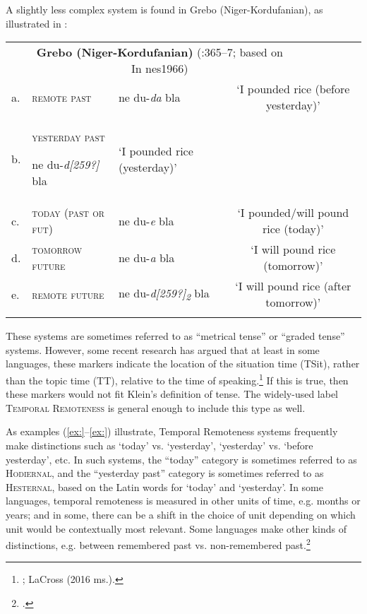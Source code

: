 A slightly less complex system is found in Grebo (Niger-Kordufanian), as illustrated in :


\begin{tabularx}{\textwidth}{XXXXX}
\lsptoprule
& \multicolumn{3}{c}{\textbf{Grebo (Niger-Kordufanian)} (\citealt{Frawley1992}:365–7; based on {In nes1966})} & \\
a. & \scshape remote past & ne du-\textit{da} bla & \multicolumn{2}{c}{‘I pounded rice (before yesterday)’}\\
b. & {\scshape yesterday past}

ne du-\textit{d[259?]} bla & ‘I pounded rice (yesterday)’ & \multicolumn{2}{c}{}\\
c. & \scshape today (past or fut) & ne du-\textit{e} bla & \multicolumn{2}{c}{‘I pounded/will pound rice (today)’}\\
d. & \scshape tomorrow future & ne du-\textit{a} bla & \multicolumn{2}{c}{‘I will pound rice (tomorrow)’}\\
e. & \scshape remote future & ne du-\textit{d[259?]\textsubscript{2}} bla & \multicolumn{2}{c}{‘I will pound rice (after tomorrow)’}\\
\lspbottomrule
\end{tabularx}

These systems are sometimes referred to as “metrical tense” or “graded tense” systems. However, some recent research has argued that at least in some languages, these markers indicate the location of the situation time (TSit), rather than the topic time (TT), relative to the time of speaking.\footnote{\citet{Cable2013}; LaCross (2016 ms.).} If this is true, then these markers would not fit Klein’s definition of tense. The widely-used label \textsc{Temporal Remoteness} is general enough to include this type as well.



As examples (\ref{ex:}--\ref{ex:}) illustrate, Temporal Remoteness systems frequently make distinctions such as ‘today’ vs. ‘yesterday’, ‘yesterday’ vs. ‘before yesterday’, etc. In such systems, the “today” category is sometimes referred to as \textsc{Hodiernal}, and the “yesterday past” category is sometimes referred to as \textsc{Hesternal}, based on the Latin words for ‘today’ and ‘yesterday’. In some languages, temporal remoteness is measured in other units of time, e.g. months or years; and in some, there can be a shift in the choice of unit depending on which unit would be contextually most relevant. Some languages make other kinds of distinctions, e.g. between remembered past vs. non-remembered past.\footnote{\citet{Botne2012}.}



